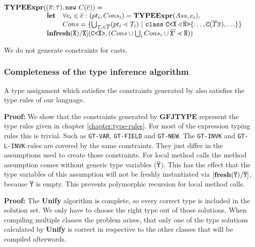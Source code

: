 \documentclass[a4paper,USenglish,cleveref, autoref, thm-restate]{lipics-v2021}
\begin{document}
\noindent
$\begin{array}{@{}l@{}l}
\typeExpr &(\typeAssumptions, \mathtt{new }\ C(\overline{e}) ) = \\
&\begin{array}{ll}
\textbf{let} %
& \forall e_i \in \overline{e} : (pt_i, Cons_i) = \typeExpr(Ass, e_i)  ,\\
& Cons = \{ \bigcup_{T_i \in \overline{T}} (pt_i \lessdot T_i) \ | \ \mathtt{class }\ \exptype{C}{\ol{X} \triangleleft \ol{N}}\{ \ldots, \texttt{C}(\overline{T} \overline{x}), \ldots \} \}\\
\multicolumn{2}{l}{\mathbf{in} \textbf{fresh}(\ol{X})/\ol{X}](\exptype{C}{\ol{X}}, (Cons \cup \bigcup_i Cons_i \cup \ol{X'} \lessdot \ol{N})) }\\
\end{array}
\end{array}
$

We do not generate constraints for casts.

\subsubsection{Completeness of the type inference algorithm}
\begin{theoremAndi}
  A type assignment which satisfies the constraints generated by \FGJType also satisfies the type rules of our \TFGJ language.
\end{theoremAndi}
\textbf{Proof:}
We show that the constraints generated by \textbf{GFJTYPE}
represent the type rules given in chapter \ref{chapter:type-rules}.
For most of the expression typing rules this is trivial.
Such as \texttt{GT-VAR}, \texttt{GT-FIELD} and \texttt{GT-NEW}.
The \texttt{GT-INVK} and \texttt{GT-L-INVK} rules are covered by the same constraints.
They just differ in the assumptions used to create those constraints.
For local method calls the method assumption comes without generic type variables ($\mathtt{\overline{\tt Y}}$).
This has the effect that the type variables of this assumption will not be freshly instantiated
via $\mathtt{[\textbf{fresh}(\overline{\tt Y})/\overline{\tt Y}]}$, because $\mathtt{\overline{\tt Y}}$ is empty.
This prevents polymorphic recursion for local method calls.

\begin{theoremAndi}

\end{theoremAndi}
\textbf{Proof:} The \textbf{Unify} algorithm is complete, so every correct type is included in the solution set.
We only have to choose the right type out of those solutions.
When compiling multiple classes the problem arises,
that only one of the type solutions calculated by \textbf{Unify} is correct
in respective to the other classes that will be compiled afterwards.
\end{document}
